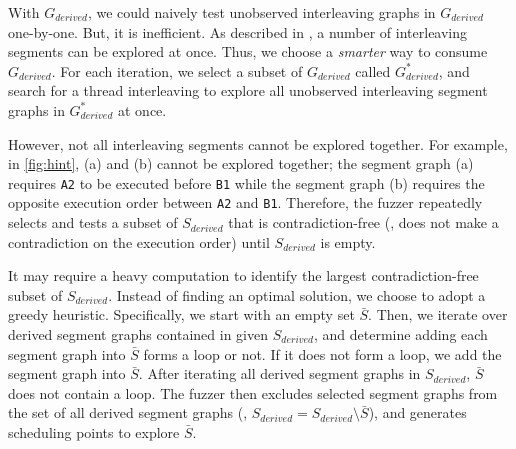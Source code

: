 





%
With $G_{derived}$, we could naively test unobserved interleaving
graphs in $G_{derived}$ one-by-one. But, it is inefficient. As
described in \dr{}, a number of interleaving segments can be explored
at once.
%
Thus, we choose a \textit{smarter} way to consume $G_{derived}$.
%
For each iteration, we select a subset of $G_{derived}$ called
$G^{*}_{derived}$, and search for a thread interleaving to explore all
unobserved interleaving segment graphs in $G^{*}_{derived}$ at once.

%




However, not all interleaving segments cannot be explored together.
%
For example, in \autoref{fig:hint}, (a) and (b) cannot be explored
together; the segment graph (a) requires \texttt{A2} to be executed
before \texttt{B1} while the segment graph (b) requires the opposite
execution order between \texttt{A2} and \texttt{B1}.
%
Therefore, the fuzzer repeatedly selects and tests a subset of
$S_{derived}$ that is contradiction-free (\ie, does not make a
contradiction on the execution order) until $S_{derived}$ is empty.


It may require a heavy computation to identify the largest
contradiction-free subset of $S_{derived}$.
%
Instead of finding an optimal solution, we choose to adopt a greedy
heuristic.
%
Specifically, we start with an empty set $\bar{S}$. Then, we iterate
over derived segment graphs contained in given $S_{derived}$, and
determine adding each segment graph into $\bar{S}$ forms a loop or
not. If it does not form a loop, we add the segment graph into
$\bar{S}$.
%
After iterating all derived segment graphs in $S_{derived}$, $\bar{S}$
does not contain a loop. The fuzzer then excludes selected segment
graphs from the set of all derived segment graphs (\ie,
$S_{derived} = S_{derived} \setminus \bar{S}$), and generates
scheduling points to explore $\bar{S}$.









